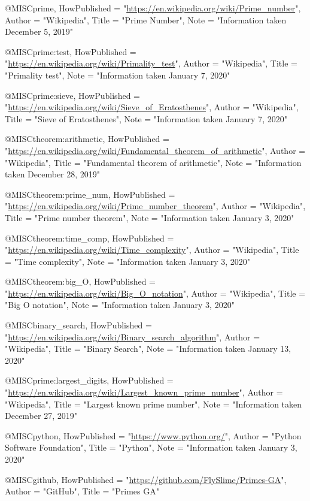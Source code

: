 @MISC{prime,
	HowPublished = "\url{https://en.wikipedia.org/wiki/Prime_number}",
	Author = "Wikipedia",
	Title = "Prime Number",
	Note = "Information taken December 5, 2019"
}

@MISC{prime:test,
	HowPublished = "\url{https://en.wikipedia.org/wiki/Primality_test}",
	Author = "Wikipedia",
	Title = "Primality test",
	Note = "Information taken January 7, 2020"
}

@MISC{prime:sieve,
	HowPublished = "\url{https://en.wikipedia.org/wiki/Sieve_of_Eratosthenes}",
	Author = "Wikipedia",
	Title = "Sieve of Eratosthenes",
	Note = "Information taken January 7, 2020"
}

@MISC{theorem:arithmetic,
	HowPublished = "\url{https://en.wikipedia.org/wiki/Fundamental_theorem_of_arithmetic}",
	Author = "Wikipedia",
	Title = "Fundamental theorem of arithmetic",
	Note = "Information taken December 28, 2019"
}

@MISC{theorem:prime_num,
	HowPublished = "\url{https://en.wikipedia.org/wiki/Prime_number_theorem}",
	Author = "Wikipedia",
	Title = "Prime number theorem",
	Note = "Information taken January 3, 2020"
}

@MISC{theorem:time_comp,
	HowPublished = "\url{https://en.wikipedia.org/wiki/Time_complexity}",
	Author = "Wikipedia",
	Title = "Time complexity",
	Note = "Information taken January 3, 2020"
}

@MISC{theorem:big_O,
	HowPublished = "\url{https://en.wikipedia.org/wiki/Big_O_notation}",
	Author = "Wikipedia",
	Title = "Big O notation",
	Note = "Information taken January 3, 2020"
}

@MISC{binary_search,
	HowPublished = "\url{https://en.wikipedia.org/wiki/Binary_search_algorithm}",
	Author = "Wikipedia",
	Title = "Binary Search",
	Note = "Information taken January 13, 2020"
}

@MISC{prime:largest_digits,
	HowPublished = "\url{https://en.wikipedia.org/wiki/Largest_known_prime_number}",
	Author = "Wikipedia",
	Title = "Largest known prime number",
	Note = "Information taken December 27, 2019"
}

@MISC{python,
	HowPublished = "\url{https://www.python.org/}",
	Author = "Python Software Foundation",
	Title = "Python",
	Note = "Information taken January 3, 2020"
}

@MISC{github,
		HowPublished = "\url{https://github.com/FlySlime/Primes-GA}",
		Author = "GitHub",
		Title = "Primes GA"
}